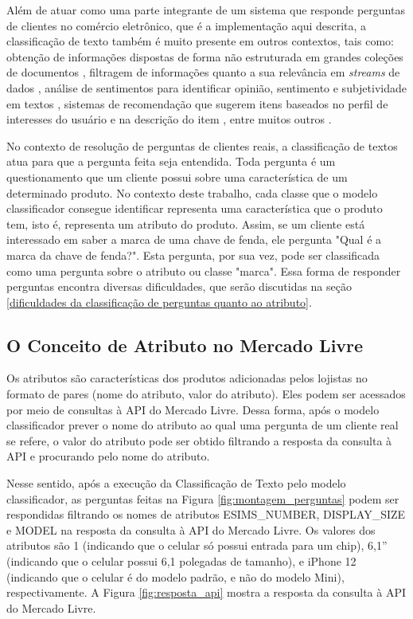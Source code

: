 Além de atuar como uma parte integrante de um sistema que responde perguntas de clientes no comércio eletrônico, que é a implementação aqui descrita, a classificação de texto também é muito presente em outros contextos, tais como: obtenção de informações dispostas de forma não estruturada em grandes coleções de documentos \cite{info-retrieval}, filtragem de informações quanto a sua relevância em \textit{streams} de dados \cite{info-filtering}, análise de sentimentos para identificar opinião, sentimento e subjetividade em textos \cite{sentiment-analysis}, sistemas de recomendação que sugerem itens baseados no perfil de interesses do usuário e na descrição do item \cite{recommender-systems}, entre muitos outros \cite{survey2}.

No contexto de resolução de perguntas de clientes reais, a classificação de textos atua para que a pergunta feita seja entendida. Toda pergunta é um questionamento que um cliente possui sobre uma característica de um determinado produto. No contexto deste trabalho, cada classe que o modelo classificador consegue identificar representa uma característica que o produto tem, isto é, representa um atributo do produto. Assim, se um cliente está interessado em saber a marca de uma chave de fenda, ele pergunta "Qual é a marca da chave de fenda?". Esta pergunta, por sua vez, pode ser classificada como uma pergunta sobre o atributo ou classe "marca". Essa forma de responder perguntas encontra diversas dificuldades, que serão discutidas na seção \ref{dificuldades da classificação de perguntas quanto ao atributo}.

\subsection{O Conceito de Atributo no Mercado Livre}
\label{o conceito de atributo no mercado livre}
Os atributos são características dos produtos adicionadas pelos lojistas no formato de pares (nome do atributo, valor do atributo). Eles podem ser acessados por meio de consultas à API do Mercado Livre. Dessa forma, após o modelo classificador prever o nome do atributo ao qual uma pergunta de um cliente real se refere, o valor do atributo pode ser obtido filtrando a resposta da consulta à API e procurando pelo nome do atributo.

Nesse sentido, após a execução da Classificação de Texto pelo modelo classificador, as perguntas feitas na Figura \ref{fig:montagem_perguntas} podem ser respondidas filtrando os nomes de atributos ESIMS\_NUMBER, DISPLAY\_SIZE e MODEL na resposta da consulta à API do Mercado Livre. Os valores dos atributos são 1 (indicando que o celular só possui entrada para um chip), 6,1'' (indicando que o celular possui 6,1 polegadas de tamanho), e iPhone 12 (indicando que o celular é do modelo padrão, e não do modelo Mini), respectivamente. A Figura \ref{fig:resposta_api} mostra a resposta da consulta à API do Mercado Livre.

